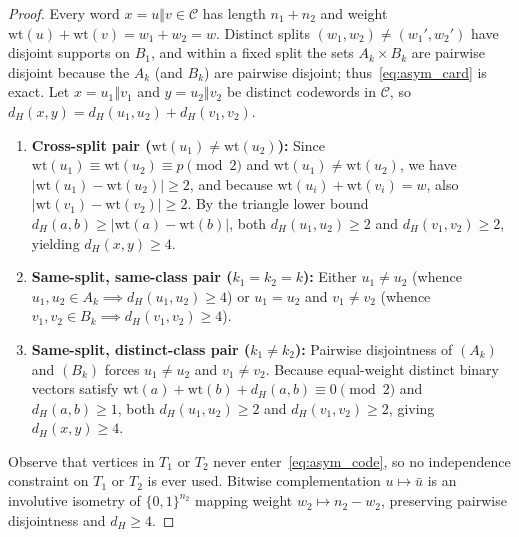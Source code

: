 \documentclass[11pt,letterpaper]{article}
\theoremstyle{plain}
\theoremstyle{definition}
\theoremstyle{remark}
\newcommand{\wt}{\mathrm{wt}}
\begin{document}
\begin{proof}
Every word $x = u \mathbin{\Vert} v \in \mathcal{C}$ has length $n_1 + n_2$ and weight $\wt(u) + \wt(v) = w_1 + w_2 = w$. Distinct splits $(w_1, w_2) \neq (w_1', w_2')$ have disjoint supports on $B_1$, and within a fixed split the sets $A_k \times B_k$ are pairwise disjoint because the $A_k$ (and $B_k$) are pairwise disjoint; thus~\eqref{eq:asym_card} is exact. Let $x = u_1 \mathbin{\Vert} v_1$ and $y = u_2 \mathbin{\Vert} v_2$ be distinct codewords in $\mathcal{C}$, so $d_H(x, y) = d_H(u_1, u_2) + d_H(v_1, v_2)$.
\begin{enumerate}[leftmargin=1.6em,itemsep=1.5pt]
    \item \textbf{Cross-split pair ($\wt(u_1) \neq \wt(u_2)$):} Since $\wt(u_1) \equiv \wt(u_2) \equiv p \pmod 2$ and $\wt(u_1) \neq \wt(u_2)$, we have $|\wt(u_1) - \wt(u_2)| \ge 2$, and because $\wt(u_i) + \wt(v_i) = w$, also $|\wt(v_1) - \wt(v_2)| \ge 2$. By the triangle lower bound $d_H(a, b) \ge |\wt(a) - \wt(b)|$, both $d_H(u_1, u_2) \ge 2$ and $d_H(v_1, v_2) \ge 2$, yielding $d_H(x, y) \ge 4$.
    \item \textbf{Same-split, same-class pair ($k_1 = k_2 = k$):} Either $u_1 \neq u_2$ (whence $u_1, u_2 \in A_k \implies d_H(u_1, u_2) \ge 4$) or $u_1 = u_2$ and $v_1 \neq v_2$ (whence $v_1, v_2 \in B_k \implies d_H(v_1, v_2) \ge 4$).
    \item \textbf{Same-split, distinct-class pair ($k_1 \neq k_2$):} Pairwise disjointness of $(A_k)$ and $(B_k)$ forces $u_1 \neq u_2$ and $v_1 \neq v_2$. Because equal-weight distinct binary vectors satisfy $\wt(a) + \wt(b) + d_H(a,b) \equiv 0 \pmod 2$ and $d_H(a,b) \ge 1$, both $d_H(u_1, u_2) \ge 2$ and $d_H(v_1, v_2) \ge 2$, giving $d_H(x, y) \ge 4$.
\end{enumerate}
Observe that vertices in $T_1$ or $T_2$ never enter~\eqref{eq:asym_code}, so no independence constraint on $T_1$ or $T_2$ is ever used. Bitwise complementation $u \mapsto \bar{u}$ is an involutive isometry of $\{0,1\}^{n_2}$ mapping weight $w_2 \mapsto n_2 - w_2$, preserving pairwise disjointness and $d_H \ge 4$.
\end{proof}
\end{document}
